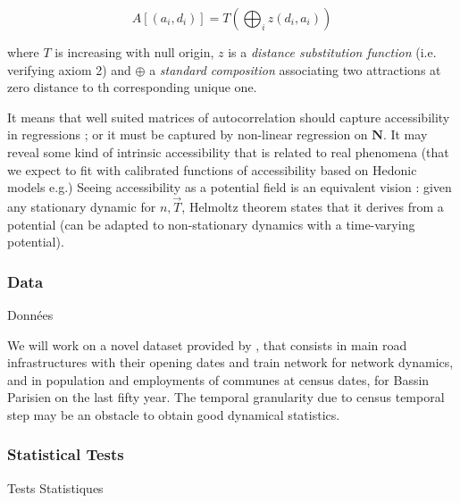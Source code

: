 \[
A\left[(a_i,d_i)\right] = T\left(\bigoplus_i z(d_i,a_i)\right)
\]

where $T$ is increasing with null origin, $z$ is a \emph{distance substitution function} (i.e. verifying axiom 2) and $\oplus$ a \emph{standard composition} associating two attractions at zero distance to th corresponding unique one. 

It means that well suited matrices of autocorrelation should capture accessibility in regressions ; 
 or it must be captured by non-linear regression on $\mathbf{N}$. It may reveal some kind of intrinsic accessibility that is related to real phenomena (that we expect to fit with calibrated functions of accessibility based on Hedonic models e.g.) Seeing accessibility as a potential field is an equivalent vision : given any stationary dynamic for $n,\vec{T}$, Helmoltz theorem states that it derives from a potential (can be adapted to non-stationary dynamics with a time-varying potential).




\subsubsection{Data}{Données}

We will work on a novel dataset provided by , that consists in main road infrastructures with their opening dates and train network for network dynamics, and in population and employments of communes at census dates, for Bassin Parisien on the last fifty year. The temporal granularity due to census temporal step may be an obstacle to obtain good dynamical statistics. 


\subsubsection{Statistical Tests}{Tests Statistiques}

